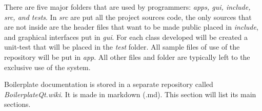 There are five major folders that are used by programmers: \textit{apps, gui, include, src, and tests}.
In \textit{src} are put all the project sources code, the only sources that are not inside are the header files that want to be made public placed in \textit{include}, and graphical interfaces put in \textit{gui}.
For each class developed will be created a unit-test that will be placed in the \textit{test} folder. All sample files of use of the repository will be put in \textit{app}.
All other files and folder are typically left to the exclusive use of the system.

Boilerplate documentation is stored in a separate repository called \textit{BoilerplateQt.wiki}. It is made in markdown (.md). This section will list its main sections.
  {\parindent0pt
    
    
    
    
    
    
  }
